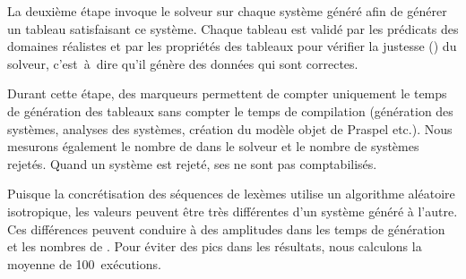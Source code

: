La deuxième étape invoque le solveur sur chaque système généré afin de générer
un tableau satisfaisant ce système. Chaque tableau est validé par les prédicats
des domaines réalistes et par les propriétés des tableaux pour vérifier la
justesse () du solveur, c'est~à~dire qu'il génère des
données qui sont correctes.

Durant cette étape, des marqueurs permettent de compter uniquement le temps de
génération des tableaux sans compter le temps de compilation (génération des
systèmes, analyses des systèmes, création du modèle objet de Praspel etc.). Nous
mesurons également le nombre de  dans le solveur et le
nombre de systèmes rejetés. Quand un système est rejeté, ses
 ne sont pas comptabilisés.

Puisque la concrétisation des séquences de lexèmes utilise un algorithme
aléatoire isotropique, les valeurs peuvent être très différentes d'un système
généré à l'autre. Ces différences peuvent conduire à des amplitudes dans les
temps de génération et les nombres de . Pour éviter des
pics dans les résultats, nous calculons la moyenne de 100~exécutions.

